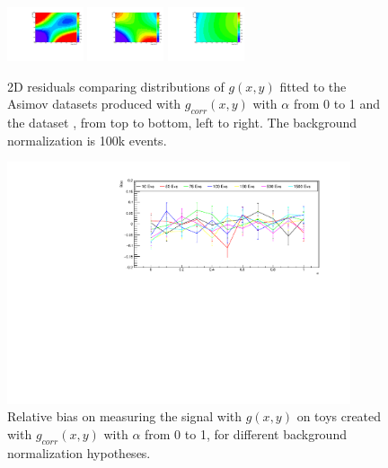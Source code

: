 \begin{figure}[thb]
\includegraphics[width=0.2\textwidth]{figures/sec-background/correlation/res_th2F_res_th2f_res_alpha_08_n100000.pdf}
\includegraphics[width=0.2\textwidth]{figures/sec-background/correlation/res_th2F_res_th2f_res_alpha_09_n100000.pdf}
\includegraphics[width=0.2\textwidth]{figures/sec-background/correlation/res_th2F_res_th2f_res_alpha_10_n100000.pdf}
  \caption{2D residuals comparing distributions of $g(x,y)$ fitted to the Asimov datasets produced with $g_{corr}(x,y)$ with $\alpha$ from 0 to 1 and the dataset , from top to bottom, left to right. The background normalization is 100k events.}
  \label{fig:res_norm100000}
\end{figure}

\begin{figure}[thb]
  \centering
\includegraphics[width=0.9\textwidth]{figures/sec-background/CorrelationBias.pdf}
\caption{Relative bias on measuring the signal with $g(x,y)$ on toys created with $g_{corr}(x,y)$ with $\alpha$ from 0 to 1, for different background normalization hypotheses.}
\label{fig:corr_bias}
\end{figure}

